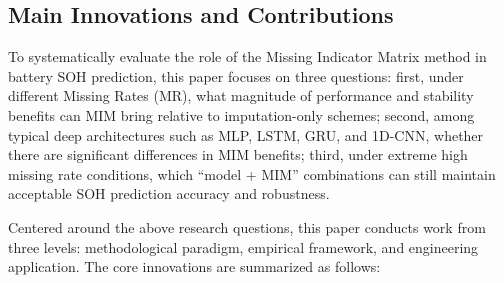 \documentclass[10pt,a4paper]{article}
\begin{document}
\subsection{Main Innovations and Contributions}

To systematically evaluate the role of the Missing Indicator Matrix method in battery SOH prediction, this paper focuses on three questions: first, under different Missing Rates (MR), what magnitude of performance and stability benefits can MIM bring relative to imputation-only schemes; second, among typical deep architectures such as MLP, LSTM, GRU, and 1D-CNN, whether there are significant differences in MIM benefits; third, under extreme high missing rate conditions, which ``model + MIM'' combinations can still maintain acceptable SOH prediction accuracy and robustness.

Centered around the above research questions, this paper conducts work from three levels: methodological paradigm, empirical framework, and engineering application. The core innovations are summarized as follows:
\end{document}
